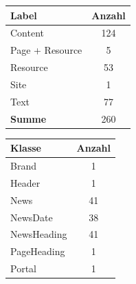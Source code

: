     \begin{table}[htb]
        \begin{subtable}[c]{0.3\textwidth}
            \centering
            \begin{tabular}{|l|c|}
                \hline
                \textbf{Label}  & \multicolumn{1}{l|}{\textbf{Anzahl}} \\ \hline
                Content         & 124                                  \\ \hline
                Page + Resource & 5                                    \\ \hline
                Resource        & 53                                   \\ \hline
                Site            & 1                                    \\ \hline
                Text            & 77                                   \\ \hline
                \hline
                \textbf{Summe}  & 260                                  \\ \hline
            \end{tabular}
            \label{table:findingsNewsFiguresNodesByLabel}
        \end{subtable}
        \begin{subtable}[c]{0.3\textwidth}
            \centering
            \begin{tabular}{|l|c|}
                \hline
                \textbf{Klasse} & \multicolumn{1}{l|}{\textbf{Anzahl}} \\ \hline
                Brand           & 1                                    \\ \hline
                Header          & 1                                    \\ \hline
                News            & 41                                   \\ \hline
                NewsDate        & 38                                   \\ \hline
                NewsHeading     & 41                                   \\ \hline
                PageHeading     & 1                                    \\ \hline
                Portal          & 1                                    \\ \hline
                \hline

\end{tabular}
\end{subtable}
\end{table}

